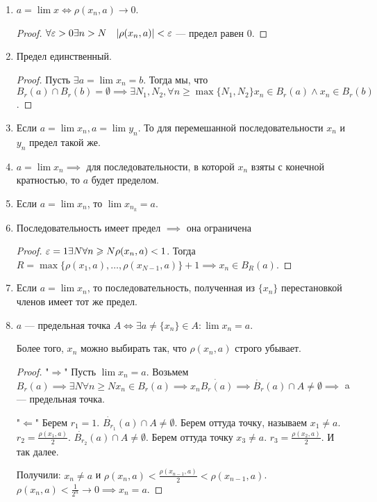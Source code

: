 \begin{properties}
    \begin{enumerate}
        \item $a = \lim x \iff \rho(x_n, a) \to 0$.
\begin{proof}
             $\forall \varepsilon > 0 \exists n > N\quad |\rho(x_n, a)| < \varepsilon$ --- предел равен 0.
\end{proof}
        \item Предел единственный. 
            \begin{proof}
                Пусть $\exists a = \lim x_n = b$. Тогда мы, что  $B_r(a) \cap B_r(b) = \emptyset \implies \exists N_1, N_2, \forall n \ge \max\{N_1, N_2\} x_n \in B_r(a) \land x_n \in B_r(b)$.
            \end{proof}
        \item Если $a = \lim x_n, a = \lim y_n$. То для перемешанной последовательности $x_n$ и  $y_n$ предел такой же.
        \item  $a = \lim x_n \implies $ для последовательности, в которой $x_n$ взяты с конечной кратностью, то  $a$ будет пределом. 
        \item Если $a = \lim x_n$, то  $\lim x_{n_k} = a$.
        \item Последовательность имеет предел $\implies$ она ограничена
             \begin{proof}
                $\varepsilon = 1 \exists N \forall n \geqslant N \rho(x_n, a) < 1$. Тогда $R = \max\{\rho(x_1, a), \ldots, \rho(x_{N-1}, a)\} + 1 \implies x_n \in B_R(a)$.
            \end{proof}
        \item Если $a = \lim x_n$, то последовательность, полученная из  $\{x_n\}$ перестановкой членов имеет тот же предел.
        \item $a$ --- предельная точка  $A \iff \exists a \neq \{x_n\} \in A\!: \lim x_n = a$.

            Более того,  $x_n$ можно выбирать так, что  $\rho(x_n, a)$ строго убывает.
            \begin{proof}
                "$\Rightarrow$" Пусть  $\lim x_n = a$. Возьмем  $B_r(a) \implies \exists N \forall n \ge N x_n \in B_r(a) \implies x_n \dot{B_r(a)} \implies \dot{B_r}(a) \cap A \neq \emptyset \implies$ a --- предельная точка.

                "$\Leftarrow$" Берем  $r_1 = 1$. $\dot{B_{r_1}}(a) \cap A \neq \emptyset$. Берем оттуда точку, называем  $x_1 \neq a$. $r_2 = \frac{\rho(x_1,a)}{2}$. $\dot{B_{r_2}}(a) \cap A \neq \emptyset$. Берем оттуда точку $x_3 \neq a$. $r_3 = \frac{\rho(x_2, a)}{2}$. И так далее.

                Получили: $x_n \neq a$ и  $\rho(x_n, a) < \frac{\rho(x_{n-1}, a)}{2} < \rho(x_{n-1}, a)$. $\rho(x_n, a) < \frac{1}{2^n} \to 0 \implies x_n = a$.
            \end{proof}
    \end{enumerate}
\end{properties}
